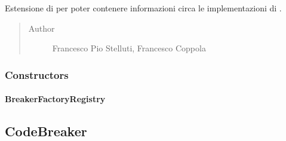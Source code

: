 \documentclass[letterpaper,10pt,italian,openany,oneside]{sphinxmanual}
\begin{document}
\begin{fulllineitems}
\label{\detokenize{source/it/unicam/cs/pa/mastermind/players/BreakerFactoryRegistry:it.unicam.cs.pa.mastermind.players.BreakerFactoryRegistry}}
Estensione di  per poter contenere informazioni circa le implementazioni di .
\begin{quote}\begin{description}
\item[{Author}] \leavevmode
Francesco Pio Stelluti, Francesco Coppola

\end{description}\end{quote}

\end{fulllineitems}



\subsubsection{Constructors}
\label{\detokenize{source/it/unicam/cs/pa/mastermind/players/BreakerFactoryRegistry:constructors}}

\paragraph{BreakerFactoryRegistry}
\label{\detokenize{source/it/unicam/cs/pa/mastermind/players/BreakerFactoryRegistry:id1}}

\begin{fulllineitems}
\label{\detokenize{source/it/unicam/cs/pa/mastermind/players/BreakerFactoryRegistry:it.unicam.cs.pa.mastermind.players.BreakerFactoryRegistry.BreakerFactoryRegistry(String)}}
\end{fulllineitems}



\subsection{CodeBreaker}
\label{\detokenize{source/it/unicam/cs/pa/mastermind/players/CodeBreaker:codebreaker}}\label{\detokenize{source/it/unicam/cs/pa/mastermind/players/CodeBreaker::doc}}
\end{document}
